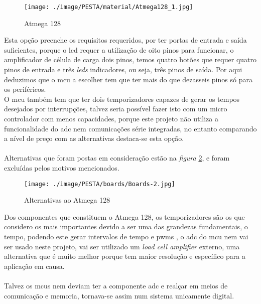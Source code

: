 \begin{figure}[H]
	\centering
	\texttt{[image: ./image/PESTA/material/Atmega128\_1.jpg]}
	\caption{Atmega 128}
	\label{Atmega_128_pinagem}
\end{figure}
Esta opção preenche os requisitos requeridos, por ter portas de entrada e saída suficientes, porque o \acs{lcd} requer a utilização de oito pinos para funcionar, o amplificador de célula de carga dois pinos, temos quatro botões que requer quatro pinos de entrada e três \textit{leds} indicadores, ou seja, três pinos de saída. Por aqui deduzimos que o \acs{mcu} a escolher tem que ter mais do que dezasseis pinos só para os periféricos.
\\
O \acs{mcu} também tem que ter dois temporizadores capazes de gerar os tempos desejados por interrupções, talvez seria possível fazer isto com um micro controlador com menos capacidades, porque este projeto não utiliza a funcionalidade do \acs{adc} nem comunicações série integradas, no entanto comparando a nível de preço com as alternativas destaca-se esta opção.
\\
\\
Alternativas que foram postas em consideração estão na \textit{figura} \ref{Boards-1}, e foram excluídas pelos motivos mencionados.
\\
\begin{figure}[H]
	\centering
	\texttt{[image: ./image/PESTA/boards/Boards-2.jpg]}
	\caption{Alternativas ao Atmega 128}
	\label{Boards-1}
\end{figure}
Dos componentes que constituem o Atmega 128, os temporizadores são os que considero os mais importantes devido a ser uma das grandezas fundamentais, o tempo, podendo este gerar intervalos de tempo e \acp{pwm}
, o \ac{adc} do \acs{mcu} nem vai ser usado neste projeto, vai ser utilizado um \textit{load cell amplifier} externo, uma alternativa que é muito melhor porque tem maior resolução e específico para a aplicação em causa.
\\
\\
Talvez os \acp{mcu} nem deviam ter a componente \acs{adc} e realçar em meios de comunicação e memoria, tornava-se assim num sistema unicamente digital.
